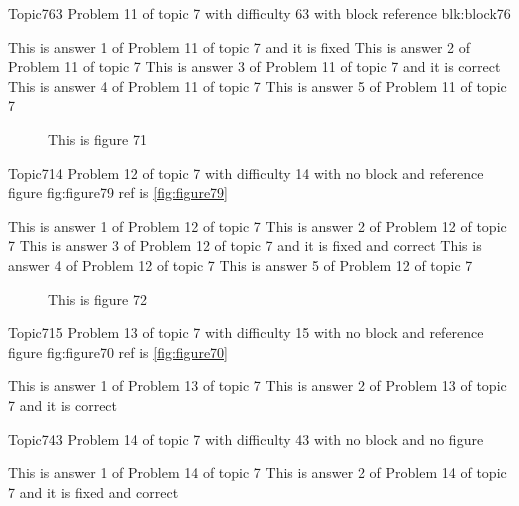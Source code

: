 \documentclass[master]{exam}
\begin{document}
\begin{problem}[requires=blk:block76]{Topic7}{63}
	Problem 11 of topic 7 with difficulty 63 with block reference blk:block76
	\begin{answers}
		\answer[fixed] This is answer 1 of Problem 11 of topic 7 and it is fixed
		\answer This is answer 2 of Problem 11 of topic 7 
		\answer[correct] This is answer 3 of Problem 11 of topic 7 and it is correct
		\answer This is answer 4 of Problem 11 of topic 7 
		\answer This is answer 5 of Problem 11 of topic 7 
	\end{answers}
\end{problem}



\begin{figure}
	\begin{center}
		This is figure 71 
		\label{fig:figure71}
	\end{center}
\end{figure}

\begin{problem}{Topic7}{14}
	Problem 12 of topic 7 with difficulty 14 with no block and reference figure fig:figure79 ref is \ref{fig:figure79}
	\begin{answers}
		\answer This is answer 1 of Problem 12 of topic 7 
		\answer This is answer 2 of Problem 12 of topic 7 
		 This is answer 3 of Problem 12 of topic 7 and it is fixed and correct
		\answer This is answer 4 of Problem 12 of topic 7 
		\answer This is answer 5 of Problem 12 of topic 7 
	\end{answers}
\end{problem}



\begin{figure}
	\begin{center}
		This is figure 72 
		\label{fig:figure72}
	\end{center}
\end{figure}

\begin{problem}{Topic7}{15}
	Problem 13 of topic 7 with difficulty 15 with no block and reference figure fig:figure70 ref is \ref{fig:figure70}
	\begin{answers}
		\answer This is answer 1 of Problem 13 of topic 7 
		\answer[correct] This is answer 2 of Problem 13 of topic 7 and it is correct
	\end{answers}
\end{problem}

\begin{problem}{Topic7}{43}
	Problem 14 of topic 7 with difficulty 43 with no block and no figure
	\begin{answers}
		\answer This is answer 1 of Problem 14 of topic 7 
		 This is answer 2 of Problem 14 of topic 7 and it is fixed and correct
	\end{answers}
\end{problem}
\end{document}
